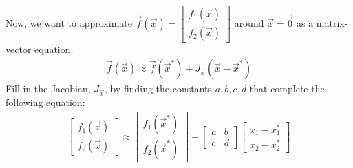 \begin{enumerate}
    \qitem Now, we want to approximate $\vec{f}(\vec{x}) = \begin{bmatrix} f_1(\vec{x}) \\ f_2(\vec{x}) \end{bmatrix}$ around $\vec{x} = \vec{0}$ as a matrix-vector equation.
    \begin{align*}
        \vec{f}(\vec{x}) \approx \vec{f}({\vec{x}^{*}}) + J_{\vec{x}}(\vec{x} - \vec{x}^{*})
    \end{align*}
    Fill in the Jacobian, $J_{\vec{x}}$, by finding the constants $a, b, c, d$ that complete the following equation:
    \begin{align*}
        \begin{bmatrix}
            f_1(\vec{x}) \\
            f_2(\vec{x})
        \end{bmatrix} \approx
        \begin{bmatrix}
            f_1(\vec{x}^{*}) \\
            f_2(\vec{x}^{*})
        \end{bmatrix} +
        \begin{bmatrix}
            a & b \\
            c & d
        \end{bmatrix}
        \begin{bmatrix}
            x_1 - x_1^{*} \\
            x_2 - x_2^{*}
        \end{bmatrix}
    \end{align*}
    \ws{
    \vspace{100px}
    }

\end{enumerate}

